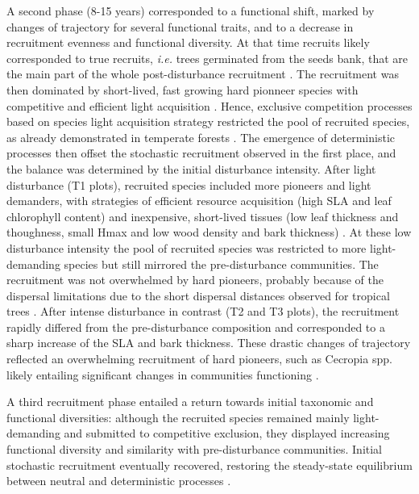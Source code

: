 \documentclass[fleqn,10pt]{ArtEcoFoG} %
\begin{document}
A second phase (8-15 years) corresponded to a functional shift, marked
by changes of trajectory for several functional traits, and to a
decrease in recruitment evenness and functional diversity. At that time
recruits likely corresponded to true recruits, \emph{i.e.} trees
germinated from the seeds bank, that are the main part of the whole
post-disturbance recruitment \citep{Lawton1988}. The recruitment was
then dominated by short-lived, fast growing hard pionneer species with
competitive and efficient light acquisition
\citep{Wright2004, Chave2009b, Herault2011, Reich2014}. Hence, exclusive
competition processes based on species light acquisition strategy
restricted the pool of recruited species, as already demonstrated in
temperate forests \citep{Chave2004, Mayfield2010, Kunstler2012}. The
emergence of deterministic processes then offset the stochastic
recruitment observed in the first place, and the balance was determined
by the initial disturbance intensity. After light disturbance (T1
plots), recruited species included more pioneers and light demanders,
with strategies of efficient resource acquisition (high SLA and leaf
chlorophyll content) and inexpensive, short-lived tissues (low leaf
thickness and thoughness, small Hmax and low wood density and bark
thickness) \citep{Hubbell1999, Schnitzer2001, Sheil2003, Bongers2009}.
At these low disturbance intensity the pool of recruited species was
restricted to more light-demanding species but still mirrored the
pre-disturbance communities. The recruitment was not overwhelmed by hard
pioneers, probably because of the dispersal limitations due to the short
dispersal distances observed for tropical trees
\citep{Leclerc2015, Scotti2015a}. After intense disturbance in contrast
(T2 and T3 plots), the recruitment rapidly differed from the
pre-disturbance composition and corresponded to a sharp increase of the
SLA and bark thickness. These drastic changes of trajectory reflected an
overwhelming recruitment of hard pioneers, such as Cecropia spp. likely
entailing significant changes in communities functioning
\citep{Diaz2005}.

A third recruitment phase entailed a return towards initial taxonomic
and functional diversities: although the recruited species remained
mainly light-demanding and submitted to competitive exclusion, they
displayed increasing functional diversity and similarity with
pre-disturbance communities. Initial stochastic recruitment eventually
recovered, restoring the steady-state equilibrium between neutral and
deterministic processes \citep{Lawton1988, Chave2004, Mayfield2010}.
\end{document}
